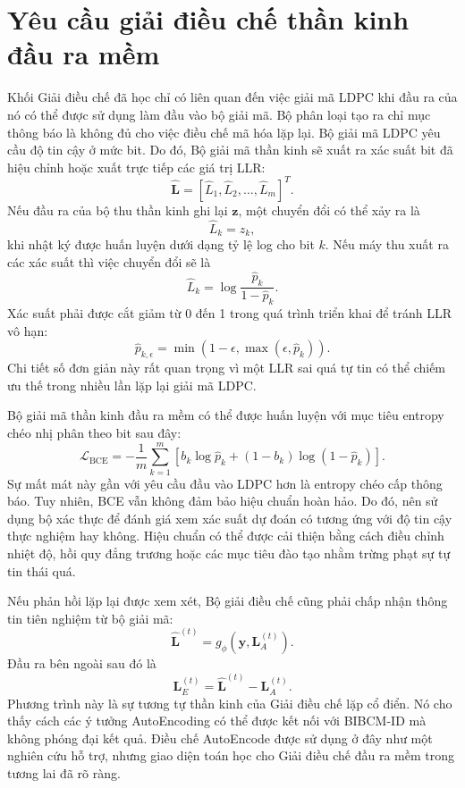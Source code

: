 \section{Yêu cầu giải điều chế thần kinh đầu ra mềm}
Khối Giải điều chế đã học chỉ có liên quan đến việc giải mã LDPC khi đầu ra của nó có thể được sử dụng làm đầu vào bộ giải mã. Bộ phân loại tạo ra chỉ mục thông báo là không đủ cho việc điều chế mã hóa lặp lại. Bộ giải mã LDPC yêu cầu độ tin cậy ở mức bit. Do đó, Bộ giải mã thần kinh sẽ xuất ra xác suất bit đã hiệu chỉnh hoặc xuất trực tiếp các giá trị LLR:
\begin{equation}
  \mathbf{\hat{L}}=
  [\hat{L}_1,\hat{L}_2,\ldots,\hat{L}_m]^T.
\end{equation}
Nếu đầu ra của bộ thu thần kinh ghi lại $\mathbf{z}$, một chuyển đổi có thể xảy ra là
\begin{equation}
  \hat{L}_k=z_k,
\end{equation}
khi nhật ký được huấn luyện dưới dạng tỷ lệ log cho bit $k$. Nếu máy thu xuất ra các xác suất thì việc chuyển đổi sẽ là
\begin{equation}
  \hat{L}_k=\log\frac{\hat{p}_k}{1-\hat{p}_k}.
\end{equation}
Xác suất phải được cắt giảm từ 0 đến 1 trong quá trình triển khai để tránh LLR vô hạn:
\begin{equation}
  \hat{p}_{k,\epsilon}=\min(1-\epsilon,\max(\epsilon,\hat{p}_k)).
\end{equation}
Chi tiết số đơn giản này rất quan trọng vì một LLR sai quá tự tin có thể chiếm ưu thế trong nhiều lần lặp lại giải mã LDPC.

Bộ giải mã thần kinh đầu ra mềm có thể được huấn luyện với mục tiêu entropy chéo nhị phân theo bit sau đây:
\begin{equation}
  \mathcal{L}_{\mathrm{BCE}}=
  -\frac{1}{m}\sum_{k=1}^{m}
  \left[
  b_k\log\hat{p}_k+(1-b_k)\log(1-\hat{p}_k)
  \right].
\end{equation}
Sự mất mát này gần với yêu cầu đầu vào LDPC hơn là entropy chéo cấp thông báo. Tuy nhiên, BCE vẫn không đảm bảo hiệu chuẩn hoàn hảo. Do đó, nên sử dụng bộ xác thực để đánh giá xem xác suất dự đoán có tương ứng với độ tin cậy thực nghiệm hay không. Hiệu chuẩn có thể được cải thiện bằng cách điều chỉnh nhiệt độ, hồi quy đẳng trương hoặc các mục tiêu đào tạo nhằm trừng phạt sự tự tin thái quá.

Nếu phản hồi lặp lại được xem xét, Bộ giải điều chế cũng phải chấp nhận thông tin tiên nghiệm từ bộ giải mã:
\begin{equation}
  \mathbf{\hat{L}}^{(t)}
  =
  g_\phi(\mathbf{y},\mathbf{L}_A^{(t)}).
\end{equation}
Đầu ra bên ngoài sau đó là
\begin{equation}
  \mathbf{L}_E^{(t)}=\mathbf{\hat{L}}^{(t)}-\mathbf{L}_A^{(t)}.
\end{equation}
Phương trình này là sự tương tự thần kinh của Giải điều chế lặp cổ điển. Nó cho thấy cách các ý tưởng AutoEncoding có thể được kết nối với BIBCM-ID mà không phóng đại kết quả. Điều chế AutoEncode được sử dụng ở đây như một nghiên cứu hỗ trợ, nhưng giao diện toán học cho Giải điều chế đầu ra mềm trong tương lai đã rõ ràng.

